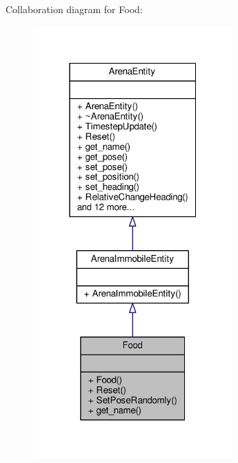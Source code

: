 Collaboration diagram for Food\+:\nopagebreak
\begin{figure}[H]
\begin{center}
\leavevmode
\includegraphics[width=217pt]{classFood__coll__graph}
\end{center}
\end{figure}
